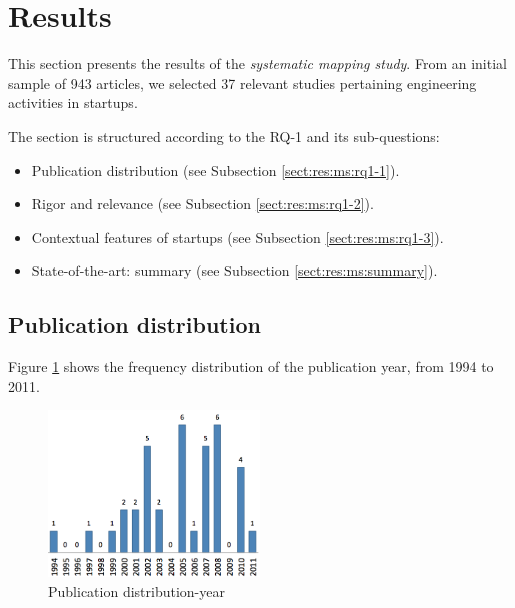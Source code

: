 \documentclass[final,5p,times,twocolumn]{elsarticle}
\begin{document}
\twocolumn

\section{Results} %
 \label{sect:results}
This section presents the results of the \textit{systematic mapping study}. From an initial sample of 943 articles, we selected 37 relevant studies pertaining engineering activities in startups.

The section is structured according to the RQ-1 and its sub-questions:

\begin{itemize}
\item Publication distribution (see Subsection \ref{sect:res:ms:rq1-1}).
\item Rigor and relevance (see Subsection \ref{sect:res:ms:rq1-2}).
\item Contextual features of startups (see Subsection \ref{sect:res:ms:rq1-3}).
\item State-of-the-art: summary (see Subsection \ref{sect:res:ms:summary}).
\end{itemize}

\subsection{Publication distribution} %
\label{sub:publication_distribution}

Figure \ref{fig:ms:year}  shows the frequency distribution of  the publication year, from 1994 to 2011. 

\begin{figure}[H]
\centering
\includegraphics[width=0.5\textwidth,keepaspectratio=true]{figures/year.png}
\caption{Publication distribution-year}
\label{fig:ms:year}
\end{figure}

\end{document}

